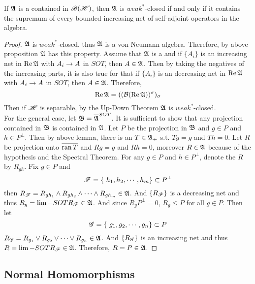\documentclass[a4paper,11pt]{report}
\begin{document}
\begin{thm}
	If $\mathfrak{A}$ is a \Cs contained in $\mathscr{B(H)}$, then $\mathfrak{A}$ is $weak^*$-closed if and only if it contains the supremum of every bounded increasing net of self-adjoint operators in the algebra.
\end{thm}
\begin{proof}
	$\mathfrak{A}$ is $weak^*$-closed, thus $\mathfrak{A}$ is  a von Neumann algebra. Therefore, by above proposition $\mathfrak{A}$ has this property. Assume that $\mathfrak{A}$ is a \Cs and if $\{A_i\}$ is an increasing net in $\operatorname{Re}{\mathfrak{A}}$ with $A_i \rightarrow A$ in $SOT$, then $A \in \mathfrak{A}$. Then by taking the negatives of the increasing parts, it is also true for that if $\{A_i\}$ is an decreasing net in $\operatorname{Re}{\mathfrak{A}}$ with $A_i \rightarrow A$ in $SOT$, then $A \in \mathfrak{A}$. Therefore, 
	\begin{equation*}
		\operatorname{Re}{\mathfrak{A}} = ((\mathcal{B}(\operatorname{Re}{\mathfrak{A}}))^{\sigma})_{\sigma}
	\end{equation*}
	Then if $\mathscr{H}$ is separable, by the Up-Down Theorem $\mathfrak{A}$ is $weak^*$-closed. \\
	For the general case, let $\mathfrak{B} = \overline{\mathfrak{A}}^{SOT}$. It is sufficient to show that any projection contained in $\mathfrak{B}$ is contained in $\mathfrak{A}$. Let $P$ be the projection in $\mathfrak{B}$ and $g \in P$ and $h \in P^{\bot}$. Then by above lemma, there is an $T \in \mathfrak{A}_+$ s.t. $Tg = g$ and $Th = 0$. Let $R$ be projection onto $\overline{\operatorname{ran}{T}}$ and $Rg = g$ and $Rh = 0$, moreover $R \in \mathfrak{A}$ because of the hypothesis and the Spectral Theorem. For any $g \in P$ and $h \in P^{\bot}$, denote the $R$ by $R_{gh}$. Fix $g \in P$ and 
	\begin{equation*}
		\mathscr{F} = \{~h_1, h_2, \cdots, h_m\} \subset P^{\bot}
	\end{equation*}
	then $R_{\mathscr{F}} = R_{gh_1} \wedge R_{gh_2} \wedge \cdots \wedge R_{gh_m} \in \mathfrak{A}$. And $\{R_{\mathscr{F}}\}$ is a decreasing net and thus $R_g = \lim-SOT R_{\mathscr{F}} \in \mathfrak{A}$. And since $R_g P^{\bot} = 0$, $R_g \leqslant P$ for all $g \in P$. Then let
	\begin{equation*}
		\mathscr{G} = \{~g_1, g_2, \cdots, g_n\} \subset P
	\end{equation*}
	$R_{\mathscr{G}} = R_{g_1} \vee R_{g_2} \vee \cdots \vee R_{g_n} \in \mathfrak{A}$. And $\{R_{\mathscr{G}}\}$ is an increasing net and thus $R = \lim-SOT R_{\mathscr{F}} \in \mathfrak{A}$. Therefore, $R = P \in \mathfrak{A}$.
\end{proof}

\subsection{Normal Homomorphisms}
\end{document}
